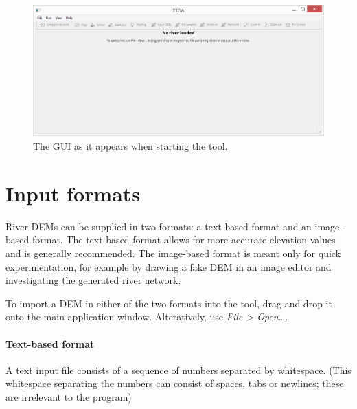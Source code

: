 \documentclass{article}
\begin{document}
\begin{figure}
    \centering
    \includegraphics[width=\linewidth]{figures/gui-start.png}
    \caption{The GUI as it appears when starting the tool.}
    \label{fig:gui-start}
\end{figure}


%


\section{Input formats}
\label{sec:input}

River DEMs can be supplied in two formats: a text-based format and an image-based format. The text-based format allows for more accurate elevation values and is generally recommended. The image-based format is meant only for quick experimentation, for example by drawing a fake DEM in an image editor and investigating the generated river network.

To import a DEM in either of the two formats into the tool, drag-and-drop it onto the main application window. Alteratively, use \emph{File \textgreater{} Open\ldots}.

\paragraph{Text-based format}
A text input file consists of a sequence of numbers separated by whitespace. (This whitespace separating the numbers can consist of spaces, tabs or newlines; these are irrelevant to the program)
\end{document}
